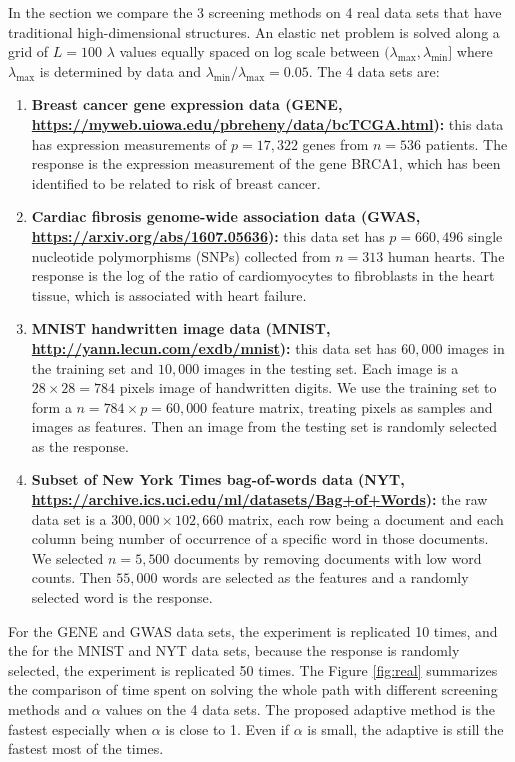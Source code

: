 In the section we compare the 3 screening methods on 4 real data sets that have traditional high-dimensional structures. An elastic net problem is solved along a grid of $L=100$ $\lambda$ values equally spaced on log scale between $(\lambda_{\max},\lambda_{\min}]$ where $\lambda_{\max}$ is determined by data and $\lambda_{\min}/\lambda_{\max}=0.05$. The 4 data sets are:

\begin{enumerate}
    \item \textbf{Breast cancer gene expression data
(GENE, \url{https://myweb.uiowa.edu/pbreheny/data/bcTCGA.html}):} this data has expression measurements of $p=17,322$ genes from $n=536$ patients. The response is the expression measurement of the gene BRCA1, which has been identified to be related to risk of breast cancer.
    \item \textbf{Cardiac fibrosis genome-wide association data
(GWAS, \url{https://arxiv.org/abs/1607.05636}):} this data set has $p=660,496$ single nucleotide
polymorphisms (SNPs) collected from $n=313$ human hearts. The response is the log of the ratio of cardiomyocytes to fibroblasts in the heart tissue, which is associated with heart failure.
    \item \textbf{MNIST handwritten image data
(MNIST, \url{http://yann.lecun.com/exdb/mnist}):} this data set has $60,000$ images in the training set and $10,000$ images in the testing set. Each image is a $28\times 28=784$ pixels image of handwritten digits. We use the training set to form a $n=784\times p=60,000$ feature matrix, treating pixels as samples and images as features. Then an image from the testing set is randomly selected as the response.
    \item \textbf{Subset of New York Times bag-of-words data
(NYT, \url{https://archive.ics.uci.edu/ml/datasets/Bag+of+Words}):} the raw data set is a $300,000\times 102,660$ matrix, each row being a document and each column being number of occurrence of a specific word in those documents. We selected $n=5,500$ documents by removing documents with low word counts. Then $55,000$ words are selected as the features and a randomly selected word is the response.
\end{enumerate}

For the GENE and GWAS data sets, the experiment is replicated 10 times, and the for the MNIST and NYT data sets, because the response is randomly selected, the experiment is replicated 50 times. The Figure \ref{fig:real} summarizes the comparison of time spent on solving the whole path with different screening methods and $\alpha$ values on the 4 data sets. The proposed adaptive method is the fastest especially when $\alpha$ is close to 1. Even if $\alpha$ is small, the adaptive is still the fastest most of the times.

